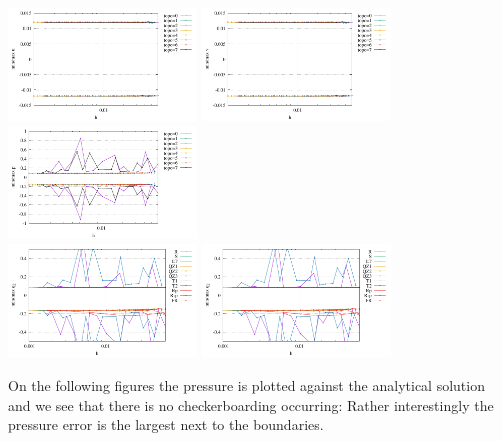 \begin{center}
\includegraphics[width=5cm]{python_codes/fieldstone_78/results/stats_u_exp1.pdf}
\includegraphics[width=5cm]{python_codes/fieldstone_78/results/stats_v_exp1.pdf}\\
\includegraphics[width=5cm]{python_codes/fieldstone_78/results/stats_p_exp1.pdf}\\
\includegraphics[width=5cm]{python_codes/fieldstone_78/results/stats_q1_exp1.pdf}
\includegraphics[width=5cm]{python_codes/fieldstone_78/results/stats_q2_exp1.pdf}
\end{center}

On the following figures the pressure is plotted against the analytical solution and 
we see that there is no checkerboarding occurring:
Rather interestingly the pressure error is the largest next to the boundaries.

